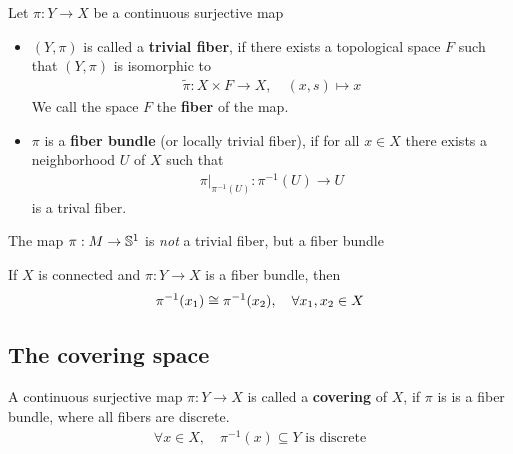 \begin{dfn}[]
  Let $\pi: Y \to X$ be a continuous surjective map
  \begin{itemize}
    \item $(Y,\pi)$ is called a \textbf{trivial fiber}, if there exists a topological space $F$ such that $(Y,\pi)$ is isomorphic to
      \begin{align*}
        \tilde{\pi}: X \times F \to  X, \quad (x,s) \mapsto x
      \end{align*}
      We call the space $F$ the \textbf{fiber} of the map.
    \item $\pi$ is a \textbf{fiber bundle} (or locally trivial fiber), if for all $x \in X$ there exists a neighborhood $U$ of $X$ such that
      \begin{align*}
        \pi|_{\pi^{-1}(U)} : \pi^{-1}(U) \to U
      \end{align*}
      is a trival fiber.
  \end{itemize}
\end{dfn}

The map $\pi: M \to  \mathbb{S}^{1}$ is \emph{not} a trivial fiber, but a fiber bundle

\begin{rem}[]
  If $X$ is connected and $\pi: Y \to X$ is a fiber bundle, then
  \begin{align*}
    \pi^{-1}(x_1) \cong \pi^{-1}(x_2), \quad \forall x_1, x_2 \in X
  \end{align*}
\end{rem}

\subsection{The covering space}
\begin{dfn}[]
  A continuous surjective map $\pi: Y \to  X$ is called a \textbf{covering} of $X$, if $\pi$ is is a fiber bundle, where all fibers are discrete.
  \begin{align*}
    \forall x \in X,\quad \pi^{-1}(x) \subseteq Y \text{ is discrete}
  \end{align*}
\end{dfn}


